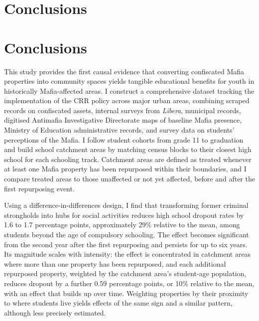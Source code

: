 \documentclass[12pt]{article}
\theoremstyle{plain}
\theoremstyle{plain}
\theoremstyle{plain}
\theoremstyle{definition}
\theoremstyle{plain}
\theoremstyle{definition}
\theoremstyle{plain}
\theoremstyle{remark}
\theoremstyle{definition}
\theoremstyle{definition}
\theoremstyle{plain}
\begin{document}
\FloatBarrier
\section{Conclusions}
\label{sec:jmp_conclusions}

\section{Conclusions}
\label{sec:jmp_conclusions}

This study provides the first causal evidence that converting confiscated Mafia properties into community spaces yields tangible educational benefits for youth in historically Mafia-affected areas. I construct a comprehensive dataset tracking the implementation of the CRR policy across major urban areas, combining scraped records on confiscated assets, internal surveys from \emph{Libera}, municipal records, digitised Antimafia Investigative Directorate maps of baseline Mafia presence, Ministry of Education administrative records, and survey data on students' perceptions of the Mafia. I follow student cohorts from grade 11 to graduation and build school catchment areas by matching census blocks to their closest high school for each schooling track. Catchment areas are defined as treated whenever at least one Mafia property has been repurposed within their boundaries, and I compare treated areas to those unaffected or not yet affected, before and after the first repurposing event.

Using a difference-in-differences design, I find that transforming former criminal strongholds into hubs for social activities reduces high school dropout rates by 1.6 to 1.7 percentage points, approximately 29\% relative to the mean, among students beyond the age of compulsory schooling. The effect becomes significant from the second year after the first repurposing and persists for up to six years. Its magnitude scales with intensity: the effect is concentrated in catchment areas where more than one property has been repurposed, and each additional repurposed property, weighted by the catchment area's student-age population, reduces dropout by a further 0.59 percentage points, or 10\% relative to the mean, with an effect that builds up over time. Weighting properties by their proximity to where students live yields effects of the same sign and a similar pattern, although less precisely estimated.
\end{document}

